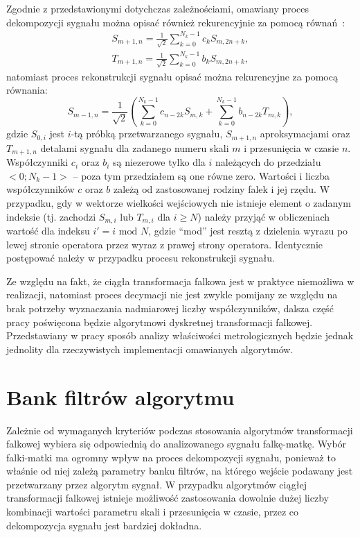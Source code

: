 Zgodnie z przedstawionymi dotychczas zależnościami, omawiany proces dekompozycji sygnału można opisać również rekurencyjnie za pomocą równań~\cite{wallen_handbook}:
\begin{gather}
S_{m+1,n} = \frac{1}{\sqrt{2}} \sum _{k=0} ^{N_k-1} c_{k} S_{m,2n+k} \label{eq:dwt_aproxrek}, \\
T_{m+1,n} = \frac{1}{\sqrt{2}} \sum _{k=0} ^{N_k-1} b_{k} S_{m,2n+k} \label{eq:dwt_detailrek},
\end{gather}
natomiast proces rekonstrukcji sygnału opisać można rekurencyjne za pomocą równania:
\begin{equation}
S_{m-1,n} = \frac{1}{\sqrt{2}} \left( \sum _{k=0} ^{N_k-1} c_{n-2k} S_{m,k} + \sum _{k=0} ^{N_k-1} b_{n-2k} T_{m,k} \right) \label{eq:dwt_reconrek},
\end{equation}
gdzie $S_{0,i}$ jest $i$-tą próbką przetwarzanego sygnału, $S_{m+1,n}$ aproksymacjami oraz $T_{m+1,n}$ detalami sygnału dla zadanego numeru skali $m$ i przesunięcia w czasie $n$. Współczynniki $c_i$ oraz $b_i$ są niezerowe tylko dla $i$ należących do przedziału $<0;N_k-1>$ -- poza tym przedziałem są one równe zero. Wartości i liczba współczynników $c$ oraz $b$ zależą od zastosowanej rodziny falek i jej rzędu. W przypadku, gdy w wektorze wielkości wejściowych nie istnieje element o zadanym indeksie (tj. zachodzi $S_{m,i}$ lub $T_{m,i}$ dla $i \ge N$) należy przyjąć w obliczeniach wartość dla indeksu $i' = i \text{ mod } N$, gdzie \enquote{mod} jest resztą z dzielenia wyrazu po lewej stronie operatora przez wyraz z prawej strony operatora. Identycznie postępować należy w przypadku procesu rekonstrukcji sygnału.

Ze względu na fakt, że ciągła transformacja falkowa jest w praktyce niemożliwa w realizacji, natomiast proces decymacji nie jest zwykle pomijany ze względu na brak potrzeby wyznaczania nadmiarowej liczby współczynników, dalsza część pracy poświęcona będzie algorytmowi dyskretnej transformacji falkowej. Przedstawiany w pracy sposób analizy właściwości metrologicznych będzie jednak jednolity dla rzeczywistych implementacji omawianych algorytmów.

\section{Bank filtrów algorytmu}

Zależnie od wymaganych kryteriów podczas stosowania algorytmów transformacji falkowej wybiera się odpowiednią do analizowanego sygnału falkę-matkę. Wybór falki-matki ma ogromny wpływ na proces dekompozycji sygnału, ponieważ to właśnie od niej zależą parametry banku filtrów, na którego wejście podawany jest przetwarzany przez algorytm sygnał. W przypadku algorytmów ciągłej transformacji falkowej istnieje możliwość zastosowania dowolnie dużej liczby kombinacji wartości parametru skali i przesunięcia w czasie, przez co dekompozycja sygnału jest bardziej dokładna.

